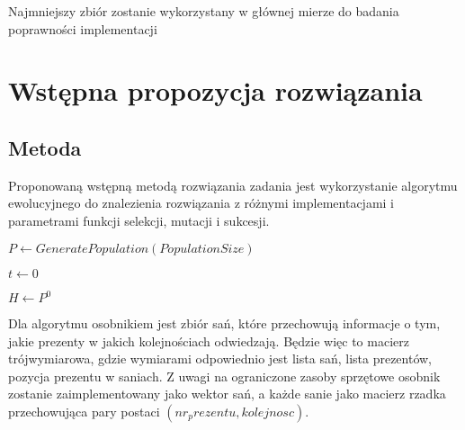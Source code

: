 \documentclass[titlepage]{article}
\begin{document}
            Najmniejszy zbiór zostanie wykorzystany w głównej mierze do badania poprawności implementacji

    \section{
        Wstępna propozycja rozwiązania
    }
        \subsection{
            Metoda
        }
            Proponowaną wstępną metodą rozwiązania zadania jest wykorzystanie algorytmu ewolucyjnego
            do znalezienia rozwiązania z różnymi implementacjami i parametrami funkcji selekcji, 
            mutacji i sukcesji.

            \begin{algorithm}[H]
                 {

                    $P \gets GeneratePopulation(PopulationSize)$

                    $t \gets 0$

                    $H \gets P^0$

                }
            \end{algorithm}

            Dla algorytmu osobnikiem jest zbiór sań, które przechowują informacje o tym, 
            jakie prezenty w jakich kolejnościach odwiedzają. Będzie więc to macierz trójwymiarowa, 
            gdzie wymiarami odpowiednio jest lista sań, lista prezentów, pozycja prezentu w saniach. 
            Z uwagi na ograniczone zasoby sprzętowe osobnik zostanie zaimplementowany jako wektor sań, 
            a każde sanie jako macierz rzadka przechowująca pary postaci $(nr_prezentu, kolejnosc)$.
\end{document}
